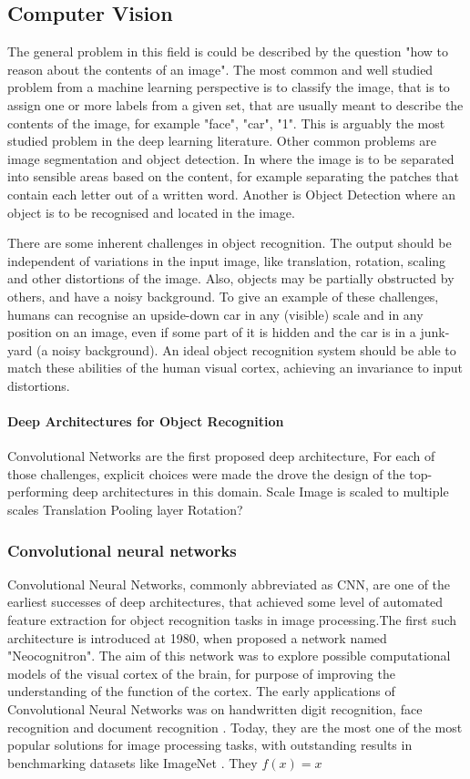\documentclass[a4paper]{report}
\begin{document}
	\subsection{Computer Vision}
		The general problem in this field is could be described by the question "how to reason about the contents of an image". 
		The most common and well studied problem from a machine learning perspective is to classify the image, that is to assign one or more labels from a given set, that are usually meant to describe the contents of the image, for example "face", "car", "1". This is arguably the most studied problem in the deep learning literature.
		Other common problems are image segmentation and object detection. In where the image is to be separated into sensible areas based on the content, for example separating the patches that contain each letter out of a written word. Another is Object Detection where an object is to be recognised and located in the image.
		
		There are some inherent challenges in object recognition. The output should be independent of variations in the input image, like translation, rotation, scaling and other distortions of the image. Also, objects may be partially obstructed by others, and have a noisy background. To give an example of these challenges, humans can recognise an upside-down car in any (visible) scale and in any position on an image, even if some part of it is hidden and the car is in a junk-yard (a noisy background). An ideal object recognition system should be able to match these abilities of the human visual cortex, achieving an invariance to input distortions. 
		
		\paragraph{Deep Architectures for Object Recognition}
		Convolutional Networks are the first proposed deep architecture,
		For each of those challenges, explicit choices were made the drove the design of the top-performing deep architectures in this domain.
		Scale
			Image is scaled to multiple scales
		Translation
			Pooling layer
		Rotation?
		\subsubsection{Convolutional neural networks}
		Convolutional Neural Networks, commonly abbreviated as CNN, are one of the earliest successes of deep architectures, that achieved some level of automated feature extraction \cite{LeCun1990} for object recognition tasks in image processing.The first such architecture is introduced at 1980, when \cite{Fukushima1980} proposed a network named "Neocognitron". The aim of this network was to explore possible computational models of the visual cortex of the brain, for purpose of improving the understanding of the function of the cortex.
		The early applications of Convolutional Neural Networks was on handwritten digit recognition\cite{LeCun1989,LeCun1990,Lecun1995}, face recognition \cite{Lawrence1997} and document recognition \cite{LeCun1998}. Today, they are the most one of the most popular solutions for image processing tasks, with outstanding results in benchmarking datasets like ImageNet \cite{Krizhevsky2012}. They
		$ f(x) = x  $
\end{document}
